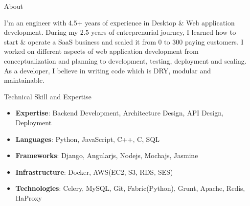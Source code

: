 \documentclass[]{mukeshcv}
\begin{document}
\thispagestyle{empty}


	\makeheader
	
	\begin{cvsection}{About}
		\begin{cvsubsection}{}{}{}
			I'm an engineer with 4.5+ years of experience in Desktop \& Web application development. During my 2.5 years of entreprenurial journey, I learned how to start \& operate a SaaS business and scaled it from 0 to 300 paying customers. I worked on different aspects of web application development from conceptualization and planning to development, testing, deployment and scaling. As a developer, I believe in writing code which is DRY, modular and maintainable.
		\end{cvsubsection}
	\end{cvsection}

	\begin{cvsection}{Technical Skill and Expertise}
		\begin{cvsubsection}{}{}{}	
			\begin{itemize}
				\item \textbf{Expertise}: Backend Development, Architecture Design, API Design, Deployment
				\item \textbf{Languages}: Python, JavaScript, C++, C, SQL
				\item \textbf{Frameworks}: Django, Angularjs, Nodejs, Mochajs, Jasmine
				\item \textbf{Infrastructure}: Docker, AWS(EC2, S3, RDS, SES)
				\item \textbf{Technologies}: Celery, MySQL, Git, Fabric(Python), Grunt, Apache, Redis, HaProxy

			\end{itemize}
		\end{cvsubsection}
	\end{cvsection}
\end{document}
